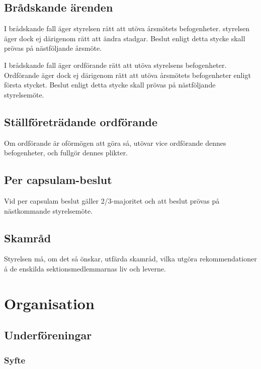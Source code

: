 \documentclass{../resources/dgovdoc}
\begin{document}
\subsection{Brådskande ärenden}

I brådskande fall äger styrelsen rätt att utöva årsmötets befogenheter.
styrelsen äger dock ej därigenom rätt att ändra stadgar. Beslut enligt detta stycke skall
prövas på nästföljande årsmöte.

I brådskande fall äger ordförande rätt att utöva styrelsens
befogenheter. Ordförande äger dock ej därigenom rätt att utöva årsmötets
befogenheter enligt första stycket. Beslut enligt detta stycke skall prövas på nästföljande styrelsemöte.

\subsection{Ställföreträdande ordförande}

Om ordförande är oförmögen att göra så, utövar vice ordförande
dennes befogenheter, och fullgör dennes plikter.

\subsection{Per capsulam-beslut}

Vid per capsulam beslut gäller 2/3-majoritet och att beslut prövas på
nästkommande styrelsemöte.

\subsection{Skamråd}

Styrelsen må, om det så önskar, utfärda skamråd, vilka utgöra
rekommendationer å de enskilda sektionsmedlemmarnas liv och leverne.

\section{Organisation}

\subsection{Underföreningar}
\label{sec:namnder}

\subsubsection{Syfte}
\end{document}
